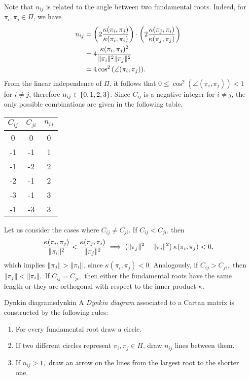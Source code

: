 Note that \(n_{ij}\) is related to the angle between two fundamental roots. Indeed, for \(\pi_i, \pi_j \in \Pi\), we have
\begin{align*}
    n_{ij} &= \left(2 \frac{\kappa(\pi_i, \pi_j)}{\kappa(\pi_i, \pi_i)}\right)\cdot\left(2\frac{\kappa(\pi_j, \pi_i)}{\kappa(\pi_j, \pi_j)}\right)\\
           &= 4 \frac{\kappa(\pi_i, \pi_j)^2}{\lVert\pi_i\rVert^2 \lVert\pi_j\rVert^2}\\
           &= 4 \cos^2{\left(\angle{(\pi_i, \pi_j)}\right)}.
\end{align*}
From the linear independence of \(\Pi\), it follows that \(0 \leq \cos^2\left(\angle(\pi_i, \pi_j)\right) < 1\) for \(i \neq j\), therefore \(n_{ij} \in \{0,1,2,3\}\). Since \(C_{ij}\) is a negative integer for \(i \neq j\), the only possible combinations are given in the following table.
\begin{table}[H]
    \begin{center}
        \begin{tabular}{c c c}
            \toprule
            \(C_{ij}\) & \(C_{ji}\) & \(n_{ij}\)\\
            \midrule
            0 & 0 & 0\\
            -1 & -1 & 1\\
            -1 & -2 & 2\\
            -2 & -1 & 2\\
            -3 & -1 & 3\\
            -1 & -3 & 3\\
            \bottomrule
        \end{tabular}
    \end{center}
\end{table}

Let us consider the cases where \(C_{ij} \neq C_{ji}.\) If \(C_{ij} < C_{ji}\), then
\begin{equation*}
    \frac{\kappa(\pi_i, \pi_j)}{\lVert\pi_i\rVert^2} < \frac{\kappa(\pi_j, \pi_i)}{\lVert\pi_j\rVert^2} \implies \left(\lVert\pi_j\rVert^2 - \lVert\pi_i\rVert^2\right)\kappa(\pi_i, \pi_j) < 0,
\end{equation*}
which implies \(\lVert\pi_j\rVert > \lVert\pi_i\rVert,\) since \(\kappa(\pi_i, \pi_j) < 0.\) Analogously, if \(C_{ij} > C_{ji},\) then \(\lVert\pi_j\rVert < \lVert\pi_i\rVert.\) If \(C_{ij} = C_{ji},\) then either the fundamental roots have the same length or they are orthogonal with respect to the inner product \(\kappa.\)

\begin{definition}{Dynkin diagrams}{dynkin}
    A \emph{Dynkin diagram} associated to a Cartan matrix is constructed by the following rules:
    \begin{enumerate}[label=(\alph*)]
        \item For every fundamental root draw a circle.
        \item If two different circles represent \(\pi_i, \pi_j \in \Pi\), draw \(n_{ij}\) lines between them.
        \item If \(n_{ij} > 1, \) draw an arrow on the lines from the largest root to the shorter one.
    \end{enumerate}
\end{definition}

